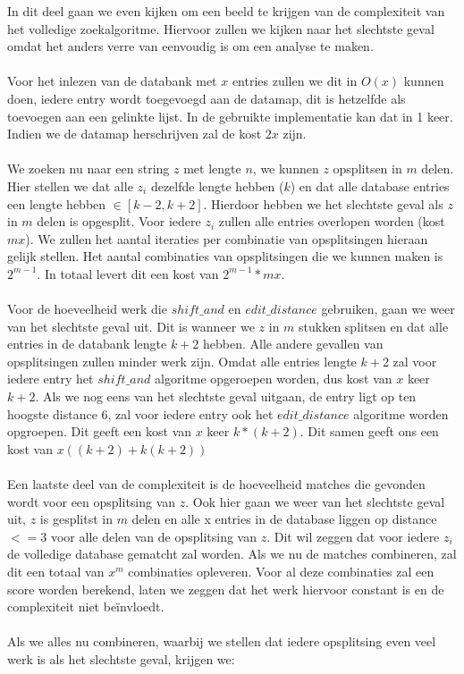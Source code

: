 \documentclass[11pt]{article}
\begin{document}
In dit deel gaan we even kijken om een beeld te krijgen van de complexiteit van het volledige zoekalgoritme. Hiervoor zullen we kijken naar het slechtste geval omdat het anders verre van eenvoudig is om een analyse te maken.\\\\
Voor het inlezen van de databank met $x$ entries zullen we dit in $O(x)$ kunnen doen, iedere entry wordt toegevoegd aan de datamap, dit is hetzelfde als toevoegen aan een gelinkte lijst. In de gebruikte implementatie kan dat in 1 keer. Indien we de datamap herschrijven zal de kost $2x$ zijn.\\
\\
We zoeken nu naar een string $z$ met lengte $n$, we kunnen $z$ opsplitsen in $m$ delen. Hier stellen we dat alle $z_i$ dezelfde lengte hebben ($k$) en dat alle database entries een lengte hebben $\in[k-2, k+2]$. Hierdoor hebben we het slechtste geval als $z$ in $m$ delen is opgesplit. Voor iedere $z_i$ zullen alle entries overlopen worden (kost $mx$). We zullen het aantal iteraties per combinatie van opsplitsingen hieraan gelijk stellen. Het aantal combinaties van opsplitsingen die we kunnen maken is $2^{m-1}$. In totaal levert dit een kost van $2^{m-1}*mx$.\\
\\
Voor de hoeveelheid werk die $shift\_and$ en $edit\_distance$ gebruiken, gaan we weer van het slechtste geval uit. Dit is wanneer we $z$ in $m$ stukken splitsen en dat alle entries in de databank lengte $k+2$ hebben. Alle andere gevallen van opsplitsingen zullen minder werk zijn. Omdat alle entries lengte $k+2$ zal voor iedere entry het $shift\_and$ algoritme opgeroepen worden, dus kost van $x$ keer $k+2$. Als we nog eens van het slechtste geval uitgaan, de entry ligt op ten hoogste distance 6, zal voor iedere entry ook het $edit\_distance$ algoritme worden opgroepen. Dit geeft een kost van $x$ keer $k*(k+2)$. Dit samen geeft ons een kost van $x((k+2) + k(k+2))$\\
\\
Een laatste deel van de complexiteit is de hoeveelheid matches die gevonden wordt voor een opsplitsing van $z$. Ook hier gaan we weer van het slechtste geval uit, $z$ is gesplitst in $m$ delen en alle x entries in de database liggen op distance $<= 3$ voor alle delen van de opsplitsing van $z$. Dit wil zeggen dat voor iedere $z_i$ de volledige database gematcht zal worden. Als we nu de matches combineren, zal dit een totaal van $x^m$ combinaties opleveren. Voor al deze combinaties zal een score worden berekend, laten we zeggen dat het werk hiervoor constant is en de complexiteit niet beïnvloedt.\\
\\
Als we alles nu combineren, waarbij we stellen dat iedere opsplitsing even veel werk is als het slechtste geval, krijgen we: \\
\end{document}
